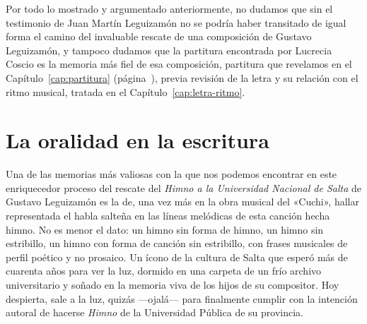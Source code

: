 Por todo lo mostrado y argumentado anteriormente, no dudamos que sin el testimonio de Juan Martín Leguizamón no se podría haber transitado de igual forma el camino del invaluable rescate de una composición de Gustavo Leguizamón, y tampoco dudamos que la partitura encontrada por Lucrecia Coscio es la memoria más fiel de esa composición, partitura que revelamos en el Capítulo~\ref{cap:partitura} (página~\pageref{cap:partitura}), previa revisión de la letra y su relación con el ritmo musical, tratada en el Capítulo~\ref{cap:letra-ritmo}.

\section{La oralidad en la escritura}
\label{sec:oralidad-escritura}

Una de las memorias más valiosas con la que nos podemos encontrar en este enriquecedor proceso del rescate del \emph{Himno a la Universidad Nacional de Salta} de Gustavo Leguizamón es la de, una vez más en la obra musical del «Cuchi», hallar representada el habla salteña en las líneas melódicas de esta canción hecha himno. No es menor el dato: un himno sin forma de himno, un himno sin estribillo, un himno con forma de canción sin estribillo, con frases musicales de perfil poético y no prosaico. Un ícono de la cultura de Salta que esperó más de cuarenta años para ver la luz, dormido en una carpeta de un frío archivo universitario y soñado en la memoria viva de los hijos de su compositor. Hoy despierta, sale a la luz, quizás ---ojalá--- para finalmente cumplir con la intención autoral de hacerse \emph{Himno} de la Universidad Pública de su provincia.
